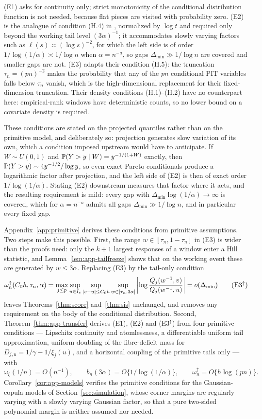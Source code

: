 (E1) asks for continuity only; strict monotonicity of the conditional
distribution function is not needed, because flat pieces are visited with
probability zero. (E2) is the analogue of condition (H.4) in
\citet{gardesPodgorny2025}, normalized by $\log t$ and required only beyond
the working tail level $(3\alpha)^{-1}$; it accommodates slowly varying
factors such as $\ell(s)\asymp(\log s)^{-2}$, for which the left side is of
order $1/\log(1/\alpha)\asymp1/\log n$ when $\alpha=n^{-a}$, so gaps
$\Delta_{\min}\gg1/\log n$ are covered and smaller gaps are not. (E3)
adapts their condition (H.5): the truncation $\tau_n=(pn)^{-2}$ makes the
probability that any of the $pn$ conditional PIT variables falls below
$\tau_n$ vanish, which is the high-dimensional replacement for their
fixed-dimension truncation. Their density conditions (H.1)--(H.2)
have no counterpart here: empirical-rank windows have deterministic counts,
so no lower bound on a covariate density is required.

These conditions are stated on the projected quantiles rather than on
the primitive model, and deliberately so: projection generates slow
variation of its own, which a condition imposed upstream would have to
anticipate. If $W\sim U(0,1)$ and $\mathbb P(Y>y\mid W)=y^{-1/(1+W)}$
exactly, then $\mathbb P(Y>y)\sim4y^{-1/2}/\log y$, so even exact Pareto
conditionals produce a logarithmic factor after projection, and the
left side of (E2) is then of exact order $1/\log(1/\alpha)$. Stating
(E2) downstream measures that factor where it acts, and the resulting
requirement is mild: every gap with $\Delta_{\min}\log(1/\alpha)
\to\infty$ is covered, which for $\alpha=n^{-a}$ admits all gaps
$\Delta_{\min}\gg1/\log n$, and in particular every fixed gap.

Appendix~\ref{app:primitive} derives these conditions from primitive
assumptions. Two steps make this possible. First, the range
$w\in[\tau_n,1-\tau_n]$ in (E3) is wider than the proofs need: only the
$k+1$ largest responses of a window enter a Hill statistic, and
Lemma~\ref{lem:app-tailfreeze} shows that on the working event these are
generated by $w\le3\alpha$. Replacing (E3) by the tail-only condition
\[
 \omega_n^{\uparrow}(C_0h,\tau_n,\alpha)
 =\max_{j\le p}\sup_{u\in\I}
 \sup_{|v-u|\le C_0h}\sup_{w\in[\tau_n,3\alpha]}
 \left|\log\frac{Q_j(w^{-1},v)}{Q_j(w^{-1},u)}\right|
 =o(\Delta_{\min})
 \tag{E3$^{\uparrow}$}
\]
leaves Theorems~\ref{thm:score} and~\ref{thm:sis} unchanged, and removes
any requirement on the body of the conditional distribution. Second,
Theorem~\ref{thm:app-transfer} derives (E1), (E2) and (E3$^{\uparrow}$)
from four primitive conditions --- Lipschitz continuity and
atomlessness, a differentiable uniform tail approximation, uniform
doubling of the fibre-deficit mass for
$D_{j,u}=1/\gamma-1/\xi_j(u)$, and a horizontal coupling of the
primitive tails only --- with
\[
 \omega_\xi(1/n)=O(n^{-1}),
 \qquad
 b_n(3\alpha)=O\{1/\log(1/\alpha)\},
 \qquad
 \omega_n^{\uparrow}=O\{h\log(pn)\}.
\]
Corollary~\ref{cor:app-models} verifies the primitive conditions for the
Gaussian-copula models of Section~\ref{sec:simulation}, whose corner
margins are regularly varying with a slowly varying Gaussian factor, so
that a pure two-sided polynomial margin is neither assumed nor needed.

